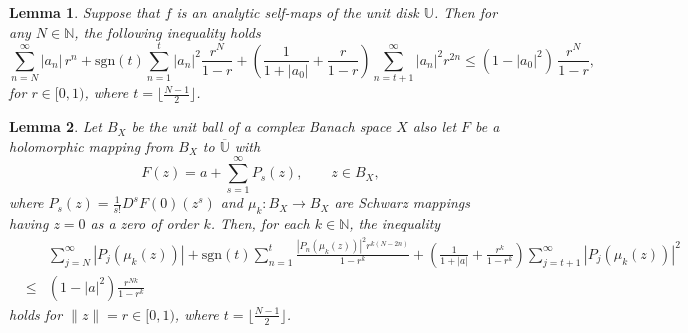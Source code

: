 \documentclass[10pt,a4paper]{amsart}
\newtheorem{lem}{Lemma}
\newcommand{\beas}{\begin{eqnarray*}}
\newcommand{\eeas}{\end{eqnarray*}}
\newcommand{\ol}{\overline}
\begin{document}
\begin{lem}\label{L2}\cite{LLP2021}
Suppose that $f$ is an analytic self-maps of the unit disk $\mathbb{U}$. Then for any $N\in \mathbb{N}$, the  following inequality holds
\[\sum_{n=N}^{\infty} |a_n|\, r^{n}+\text{sgn}(t)\sum_{n=1}^t|a_n|^2\frac{r^N}{1-r}+ \left( \frac{1}{1+|a_0|}+ \frac{r}{1-r} \right)\sum_{n=t+1}^{\infty} |a_n|^{2} r^{2n}\le (1-|a_0|^{2})\,\frac{r^N}{1-r},\]
for $r\in [0,1)$, where $t=\lfloor \frac{N-1}{2}\rfloor$.
\end{lem}

\begin{lem}\label{L3}
Let $B_{X}$ be the unit ball of a complex Banach space $X$ also let $F$ be a holomorphic mapping from $B_{X}$ to $\ol{\mathbb{U}}$ with
\[
F(z)=a+\sum_{s=1}^{\infty}P_{s}(z), \qquad z\in B_{X},
\]
where $P_{s}(z)=\frac{1}{s!}D^{s}F(0)(z^{s})$ and   $\mu_k:B_{X}\to B_{X}$ are  Schwarz mappings having $z=0$ as a zero of order $k$. Then, for each $k\in\mathbb{N}$, the inequality
\beas\label{eq:lemma3}
&&\sum_{j=N}^{\infty} |P_j(\mu_k(z))| +\text{sgn}(t)\sum_{n=1}^t\frac{|P_n(\mu_k(z))|^2r^{k(N-2n)}}{1-r^k}
+\left(\frac{1}{1+|a|}+\frac{r^k}{1-r^k}\right)
\sum_{j=t+1}^{\infty} |P_j(\mu_k(z))|^2\nonumber\\
&\le& (1-|a|^2)\frac{r^{Nk}}{1-r^k}
\eeas
holds for $\|z\|=r\in[0,1)$, where $t=\lfloor \frac{N-1}{2}\rfloor$.
\end{lem}
\end{document}
